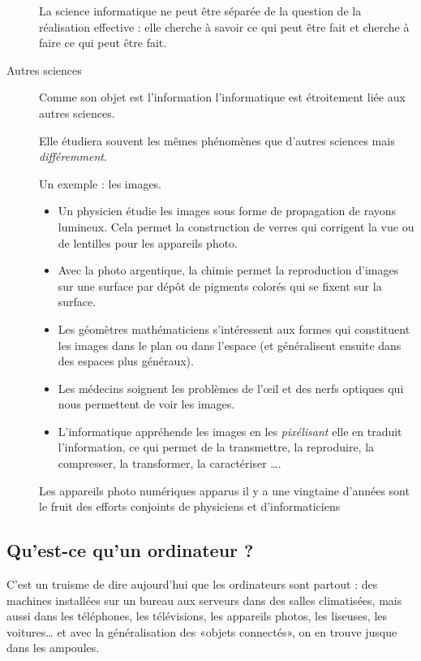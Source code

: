 \begin{description}
La science informatique ne peut être séparée de la question de la réalisation effective : elle cherche à savoir ce qui peut être fait et cherche à faire ce qui peut être fait.
\item[Autres sciences]
Comme son objet est l'information l'informatique est étroitement liée aux autres sciences.

Elle étudiera souvent les mêmes phénomènes que d'autres sciences mais {\it différemment}.

Un exemple  : les images. 

\begin{itemize}
\item Un physicien étudie   les images sous forme de propagation de rayons lumineux. Cela permet la construction de verres qui corrigent la vue ou de lentilles pour les appareils
photo.
\item Avec la photo argentique, la chimie permet la reproduction d'images sur une surface par dépôt de pigments colorés qui se fixent sur la surface.
\item Les géomètres mathématiciens s'intéressent aux formes qui constituent les images dans le plan ou dans l'espace (et généralisent ensuite dans des espaces plus généraux).
\item Les médecins soignent les problèmes de l'œil et des nerfs optiques qui nous permettent de voir les images.
\item L'informatique  appréhende  les images en les {\it pixélisant} elle en traduit l'information, ce qui permet de la transmettre, la reproduire, la compresser, la transformer, la caractériser \dots.
\end{itemize}

Les appareils photo numériques apparus il y a une vingtaine d’années sont le fruit des efforts conjoints de physiciens et d'informaticiens
\end{description}

\subsection{Qu'est-ce qu'un ordinateur ?}

C'est un truisme de dire aujourd'hui que les ordinateurs sont partout : des machines installées sur un bureau aux serveurs dans des salles climatisées, mais aussi dans les téléphones, les télévisions, les appareils photos, les liseuses, les voitures\dots{} et avec la généralisation des «objets connectés», on en trouve jusque dans les ampoules.

